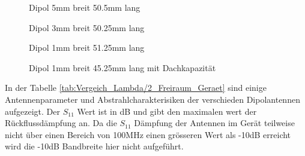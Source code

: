 \begin{figure}[h]
\begin{center}
\end{center}
\caption{Dipol 5mm breit 50.5mm lang}
\label{fig:Dipol5mmxxlang}
\end{figure}
\begin{figure}[h]
\begin{center}
\end{center}
\caption{Dipol 3mm breit 50.25mm lang}
\label{fig:Dipol3mm5025lang}
\end{figure}
\begin{figure}[h]
\begin{center}
\end{center}
\caption{Dipol 1mm breit 51.25mm lang}
\label{fig:Dipol1mm5125lang}
\end{figure}
\begin{figure}[h!]
\begin{center}
\end{center}
\caption{Dipol 1mm breit 45.25mm lang mit Dachkapazität}
\label{fig:Dipol1mm4525langDachkapazität}
\end{figure}
In der Tabelle \ref{tab:Vergeich_Lambda/2_Freiraum_Geraet} sind einige Antennenparameter und Abstrahlcharakterisiken der verschieden Dipolantennen aufgezeigt. Der $S_{11}$ Wert ist in dB und gibt den maximalen wert der Rückflussdämpfung an. Da die $S_{11}$ Dämpfung der Antennen im Gerät teilweise nicht über einen Bereich von 100MHz einen grösseren Wert als -10dB erreicht wird die -10dB Bandbreite hier nicht aufgeführt.
